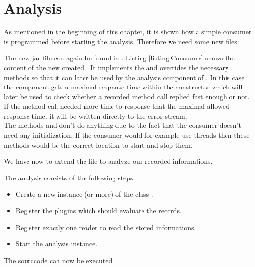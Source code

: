 	\section{Analysis}\label{sec:example:analysis}
		As mentioned in the beginning of this chapter, it is shown how a simple consumer is programmed before starting the analysis. Therefore we need some new files:

		
		The new jar-file can again be found in . Listing \ref{listing:Consumer} shows the content of the new created . It implements the  and overrides the necessary methods so that it can later be used by the analysis component of \Kieker. In this case the component gets a maximal response time within the constructor which will later be used to check whether a recorded method call replied fast enough or not. If the method call needed more time to response that the maximal allowed response time, it will be written directly to the error stream.\\
		The methods  and  don't do anything due to the fact that the consumer doesn't need any initialization. If the consumer would for example use threads then these methods would be the correct location to start and stop them.

		\setJavaCodeListing       
		

		We have now to extend the file  to analyze our recorded informations.

		\setJavaCodeListing       
		

		\notify The analysis consists of the following steps:
		\begin{itemize}
			\item Create a new instance (or more) of the class .
			\item Register the plugins which should evaluate the records.
			\item Register exactly one reader to read the stored informations.
			\item Start the analysis instance.
		\end{itemize}
		The sourccode can now be executed:

